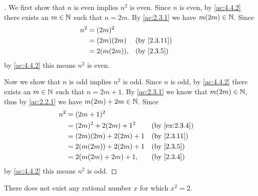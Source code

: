 \begin{proof}[]
  We first show that \(n\) is even implies \(n^2\) is even.
  Since \(n\) is even, by \cref{ac:4.4.2} there exists an \(m \in \mathbb{N}\) such that \(n = 2m\).
  By \cref{ac:2.3.1} we have \(m (2m) \in \mathbb{N}\).
  Since
  \begin{align*}
    n^2 & = (2m)^2                       \\
        & = (2m) (2m)   &  & \by{2.3.11} \\
        & = 2 (m (2m)), &  & \by{2.3.5}
  \end{align*}
  by \cref{ac:4.4.2} this means \(n^2\) is even.

  Now we show that \(n\) is odd implies \(n^2\) is odd.
  Since \(n\) is odd, by \cref{ac:4.4.2} there exists an \(m \in \mathbb{N}\) such that \(n = 2m + 1\).
  By \cref{ac:2.3.1} we know that \(m (2m) \in \mathbb{N}\), thus by \cref{ac:2.2.1} we have \(m (2m) + 2m \in \mathbb{N}\).
  Since
  \begin{align*}
    n^2 & = (2m + 1)^2                                 \\
        & = (2m)^2 + 2 (2m) + 1^2   &  & \by{ex:2.3.4} \\
        & = (2m) (2m) + 2 (2m) + 1  &  & \by{2.3.11}   \\
        & = 2 (m (2m)) + 2 (2m) + 1 &  & \by{2.3.5}    \\
        & = 2 (m (2m) + 2m) + 1,    &  & \by{2.3.4}
  \end{align*}
  by \cref{ac:4.4.2} this means \(n^2\) is odd.
\end{proof}

\begin{prop}\label{4.4.4}
  There does not exist any rational number \(x\) for which \(x^2 = 2\).
\end{prop}

